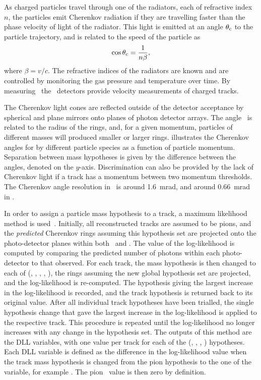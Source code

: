 As charged particles travel through one of the radiators, each of refractive 
index $n$, the particles emit Cherenkov radiation if they are travelling faster 
than the phase velocity of light of the radiator.
This light is emitted at an angle $\theta_{\textnormal{c}}$ to the particle trajectory, and is 
related to the speed of the particle as
\begin{equation}
  \cos{\ensuremath{\theta_{\textnormal{c}}}} = \frac{1}{n\beta},
\end{equation}
where $\beta = v/c$.
The refractive indices of the radiators are known and are controlled by 
monitoring the gas pressure and temperature over time.
By measuring \thetac\ the \rich\ detectors provide velocity measurements of 
charged tracks.

The Cherenkov light cones are reflected outside of the \lhcb detector 
acceptance by spherical and plane mirrors onto planes of photon detector 
arrays.
The angle \thetac\ is related to the radius of the rings, and, for a given 
momentum, particles of different masses will produced smaller or larger rings.
 illustrates the Cherenkov angles for by 
different particle species as a function of particle momentum.
Separation between mass hypotheses is given by the difference between the 
angles, denoted on the $y$-axis.
Discrimination can also be provided by the lack of Cherenkov light if a track 
has a momentum between two momentum thresholds.
The Cherenkov angle resolution in \richone\ is around \SI{1.6}{\milli\radian}, 
and around \SI{0.66}{\milli\radian} in \richtwo.

In order to assign a particle mass hypothesis to a track, a maximum likelihood 
method is used~\cite{Forty:1998eqa}.
Initially, all reconstructed tracks are assumed to be pions, and the 
\emph{predicted} Cherenkov rings assuming this hypothesis set are projected 
onto the photo-detector planes within both \richone\ and \richtwo.
The value of the log-likelihood is computed by comparing the predicted number 
of photons within each photo-detector to that observed.
For each track, the mass hypothesis is then changed to each of (\Pe, \Pmu, 
\Ppi, \PK, \Pproton), the rings assuming the new global hypothesis set are 
projected, and the log-likelihood is re-computed.
The hypothesis giving the largest increase in the log-likelihood is recorded, 
and the track hypothesis is returned back to its original value.
After all individual track hypotheses have been trialled, the single hypothesis 
change that gave the largest increase in the log-likelihood is applied to the 
respective track.
This procedure is repeated until the log-likelihood no longer increases with 
any change in the hypothesis set.
The outputs of this method are the \ac{DLL} variables, with one value per track 
for each of the (\Pe, \Pmu, \PK, \Pproton) hypotheses.
Each \ac{DLL} variable is defined as the difference in the log-likelihood value 
when the track mass hypothesis is changed from the pion hypothesis to the one 
of the variable, for example \dllkpi.
The pion \dll\ value is then zero by definition.

